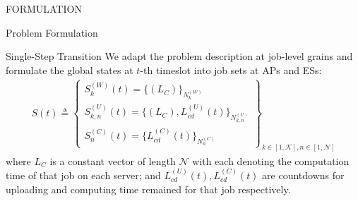 \documentclass[10pt, conference, letterpaper]{IEEEtran}
\begin{document}
\begin{section}{FORMULATION}
\begin{subsection}{Problem Formulation}
            \begin{subsubsection}{Single-Step Transition}
                We adapt the problem description at job-level grains and formulate the global states at $t$-th timeslot into job sets at APs and ESs:
                \begin{align}
                    S(t) \triangleq
                    \begin{Bmatrix}
                        S_{k}^{(W)}(t) = \{ (L_C) \}_{N_{k}^{(W)}}
                        \\
                        S_{k,n}^{(U)}(t)= \{ (L_C), L_{cd}^{(U)}(t) \}_{N_{k,n}^{(U)}}
                        \\
                        S_{n}^{(C)}(t)  = \{ L_{cd}^{(C)}(t) \}_{N_{n}^{(C)}}
                    \end{Bmatrix}
                    _{k \in [1,\mathcal{K}], n \in [1,\mathcal{N}]}
                \end{align}
                where $L_C$ is a constant vector of length $\mathcal{N}$ with each denoting the computation time of that job on each server; and $L^{(U)}_{cd}(t), L^{(C)}_{cd}(t)$ are countdowns for uploading and computing time remained for that job respectively.
            

\end{subsubsection}
\end{subsection}
\end{section}
\end{document}
